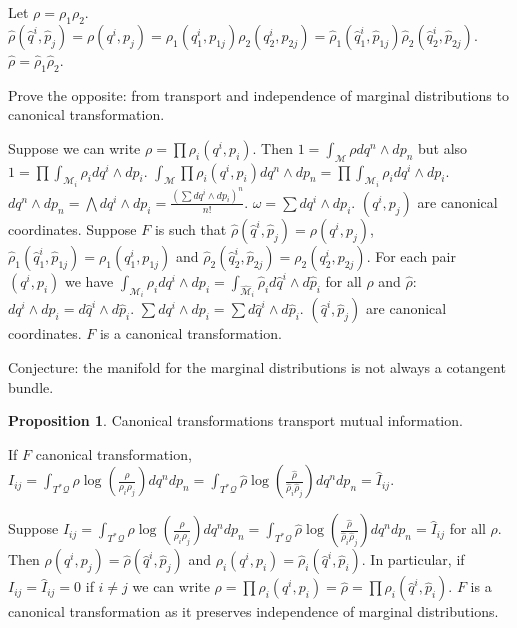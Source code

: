 \documentclass[smallextended]{svjour3}
\numberwithin{equation}{section}
\theoremstyle{definition}
\newtheorem{prop}[equation]{Proposition}
\begin{document}
Let $\rho=\rho_1\rho_2$. $\hat{\rho}(\hat{q}^i, \hat{p}_j) =\rho(q^i, p_j)=\rho_1(q_1^i, p_{1j})\rho_2(q_2^i, p_{2j})=\hat{\rho}_1(\hat{q}_1^i, \hat{p}_{1j})\hat{\rho}_2(\hat{q}_2^i, \hat{p}_{2j})$. $\hat{\rho}=\hat{\rho}_1\hat{\rho}_2$.

Prove the opposite: from transport and independence of marginal distributions to canonical transformation.

Suppose we can write $\rho=\prod\rho_i(q^i,p_i)$. Then $1 = \int_{\mathcal{M}} \rho dq^n\wedge dp_n$ but also $1 = \prod \int_{\mathcal{M}_i} \rho_i dq^i\wedge dp_i$. $\int_{\mathcal{M}} \prod\rho_i(q^i,p_i) dq^n\wedge dp_n = \prod \int_{\mathcal{M}_i} \rho_i dq^i\wedge dp_i$. $dq^n\wedge dp_n = \bigwedge dq^i\wedge dp_i = \frac{(\sum dq^i\wedge dp_i)^n}{n!}$. $\omega = \sum dq^i\wedge dp_i$. $(q^i,p_j)$ are canonical coordinates. Suppose $F$ is such that $\hat{\rho}(\hat{q}^i, \hat{p}_j) = \rho(q^i, p_j)$, $\hat{\rho}_1(\hat{q}_1^i, \hat{p}_{1j})=\rho_1(q_1^i, p_{1j})$ and $\hat{\rho}_2(\hat{q}_2^i, \hat{p}_{2j})=\rho_2(q_2^i, p_{2j})$. For each pair $(q^i, p_i)$ we have $\int_{\mathcal{M}_i} \rho_i dq^i \wedge dp_i = \int_{\hat{\mathcal{M}}_i} \hat{\rho}_i d\hat{q}^i \wedge d\hat{p}_i$ for all $\rho$ and $\hat{\rho}$: $dq^i \wedge dp_i = d\hat{q}^i \wedge d\hat{p}_i$. $\sum dq^i \wedge dp_i = \sum d\hat{q}^i \wedge d\hat{p}_i$. $(\hat{q}^i,\hat{p}_j)$ are canonical coordinates. $F$ is a canonical transformation.

Conjecture: the manifold for the marginal distributions is not always a cotangent bundle.


\begin{prop}
	Canonical transformations transport mutual information.
\end{prop}

If $F$ canonical transformation, $I_{ij} = \int_{T^*\mathcal{Q}} \rho \log (\frac{\rho}{\rho_i \rho_j}) dq^n dp_n = \int_{T^*\mathcal{Q}} \hat{\rho} \log (\frac{\hat{\rho}}{\hat{\rho}_i \hat{\rho}_j}) dq^n dp_n = \hat{I}_{ij}$.

Suppose $I_{ij} = \int_{T^*\mathcal{Q}} \rho \log (\frac{\rho}{\rho_i \rho_j}) dq^n dp_n = \int_{T^*\mathcal{Q}} \hat{\rho} \log (\frac{\hat{\rho}}{\hat{\rho}_i \hat{\rho}_j}) dq^n dp_n = \hat{I}_{ij}$ for all $\rho$. Then $\rho(q^i, p_j)=\hat{\rho}(\hat{q}^i, \hat{p}_j)$ and $\rho_i(q^i, p_i)=\hat{\rho}_i(\hat{q}^i, \hat{p}_i)$. In particular, if $I_{ij} = \hat{I}_{ij} = 0$ if $i\neq j$ we can write $\rho=\prod\rho_i(q^i,p_i) = \hat{\rho} = \prod\rho_i(\hat{q}^i,\hat{p}_i)$. $F$ is a canonical transformation as it preserves independence of marginal distributions.

\begin{thebibliography}{0}
	
\end{thebibliography}
\end{document}
